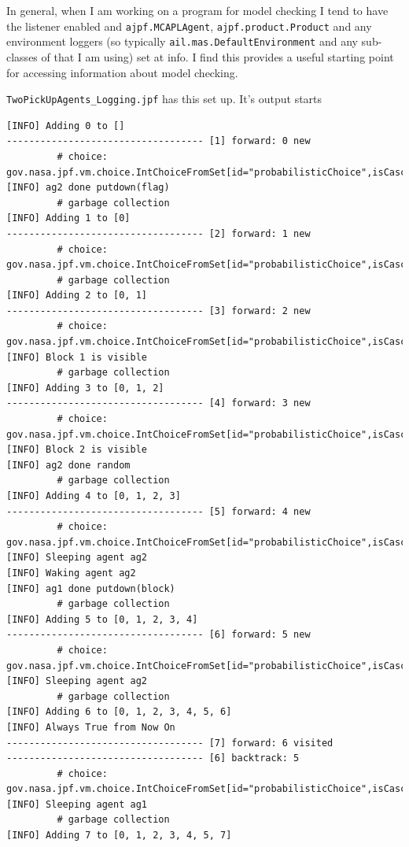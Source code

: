 In general, when I am working on a program for model checking I tend to have the  listener enabled and \texttt{ajpf.MCAPLAgent}, \texttt{ajpf.product.Product} and any environment loggers (so typically \texttt{ail.mas.DefaultEnvironment} and any sub-classes of that I am using) set at info.   I find this provides a useful starting point for accessing information about model checking.

\texttt{TwoPickUpAgents\_Logging.jpf} has this set up.  It's output starts

\begin{verbatim}
[INFO] Adding 0 to []
----------------------------------- [1] forward: 0 new
		 # choice: gov.nasa.jpf.vm.choice.IntChoiceFromSet[id="probabilisticChoice",isCascaded:false,>0,1]
[INFO] ag2 done putdown(flag)
		 # garbage collection
[INFO] Adding 1 to [0]
----------------------------------- [2] forward: 1 new
		 # choice: gov.nasa.jpf.vm.choice.IntChoiceFromSet[id="probabilisticChoice",isCascaded:false,>0,1]
		 # garbage collection
[INFO] Adding 2 to [0, 1]
----------------------------------- [3] forward: 2 new
		 # choice: gov.nasa.jpf.vm.choice.IntChoiceFromSet[id="probabilisticChoice",isCascaded:false,>0,1]
[INFO] Block 1 is visible
		 # garbage collection
[INFO] Adding 3 to [0, 1, 2]
----------------------------------- [4] forward: 3 new
		 # choice: gov.nasa.jpf.vm.choice.IntChoiceFromSet[id="probabilisticChoice",isCascaded:false,>0,1]
[INFO] Block 2 is visible
[INFO] ag2 done random
		 # garbage collection
[INFO] Adding 4 to [0, 1, 2, 3]
----------------------------------- [5] forward: 4 new
		 # choice: gov.nasa.jpf.vm.choice.IntChoiceFromSet[id="probabilisticChoice",isCascaded:false,>0,1]
[INFO] Sleeping agent ag2
[INFO] Waking agent ag2
[INFO] ag1 done putdown(block)
		 # garbage collection
[INFO] Adding 5 to [0, 1, 2, 3, 4]
----------------------------------- [6] forward: 5 new
		 # choice: gov.nasa.jpf.vm.choice.IntChoiceFromSet[id="probabilisticChoice",isCascaded:false,>0,1]
[INFO] Sleeping agent ag2
		 # garbage collection
[INFO] Adding 6 to [0, 1, 2, 3, 4, 5, 6]
[INFO] Always True from Now On
----------------------------------- [7] forward: 6 visited
----------------------------------- [6] backtrack: 5
		 # choice: gov.nasa.jpf.vm.choice.IntChoiceFromSet[id="probabilisticChoice",isCascaded:false,0,>1]
[INFO] Sleeping agent ag1
		 # garbage collection
[INFO] Adding 7 to [0, 1, 2, 3, 4, 5, 7]

\end{verbatim}

